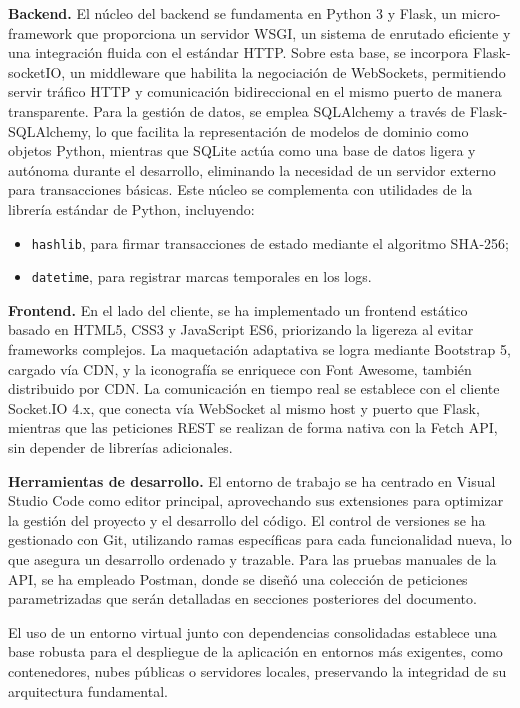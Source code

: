 \textbf{Backend.} El núcleo del backend se fundamenta en Python 3 y Flask, un micro-framework que proporciona un servidor WSGI, un sistema de enrutado eficiente y una integración fluida con el estándar HTTP. Sobre esta base, se incorpora Flask-socketIO, un middleware que habilita la negociación de WebSockets, permitiendo servir tráfico HTTP y comunicación bidireccional en el mismo puerto de manera transparente. Para la gestión de datos, se emplea SQLAlchemy a través de Flask-SQLAlchemy, lo que facilita la representación de modelos de dominio como objetos Python, mientras que SQLite actúa como una base de datos ligera y autónoma durante el desarrollo, eliminando la necesidad de un servidor externo para transacciones básicas. Este núcleo se complementa con utilidades de la librería estándar de Python, incluyendo:
\begin{itemize}
    \item \texttt{hashlib}, para firmar transacciones de estado mediante el algoritmo SHA-256;
    \item \texttt{datetime}, para registrar marcas temporales en los logs.
\end{itemize}

\textbf{Frontend.} En el lado del cliente, se ha implementado un frontend estático basado en HTML5, CSS3 y JavaScript ES6, priorizando la ligereza al evitar frameworks complejos. La maquetación adaptativa se logra mediante Bootstrap 5, cargado vía CDN, y la iconografía se enriquece con Font Awesome, también distribuido por CDN. La comunicación en tiempo real se establece con el cliente Socket.IO 4.x, que conecta vía WebSocket al mismo host y puerto que Flask, mientras que las peticiones REST se realizan de forma nativa con la Fetch API, sin depender de librerías adicionales.

\textbf{Herramientas de desarrollo.} El entorno de trabajo se ha centrado en Visual Studio Code como editor principal, aprovechando sus extensiones para optimizar la gestión del proyecto y el desarrollo del código. El control de versiones se ha gestionado con Git, utilizando ramas específicas para cada funcionalidad nueva, lo que asegura un desarrollo ordenado y trazable. Para las pruebas manuales de la API, se ha empleado Postman, donde se diseñó una colección de peticiones parametrizadas que serán detalladas en secciones posteriores del documento.

El uso de un entorno virtual junto con dependencias consolidadas establece una base robusta para el despliegue de la aplicación en entornos más exigentes, como contenedores, nubes públicas o servidores locales, preservando la integridad de su arquitectura fundamental.
